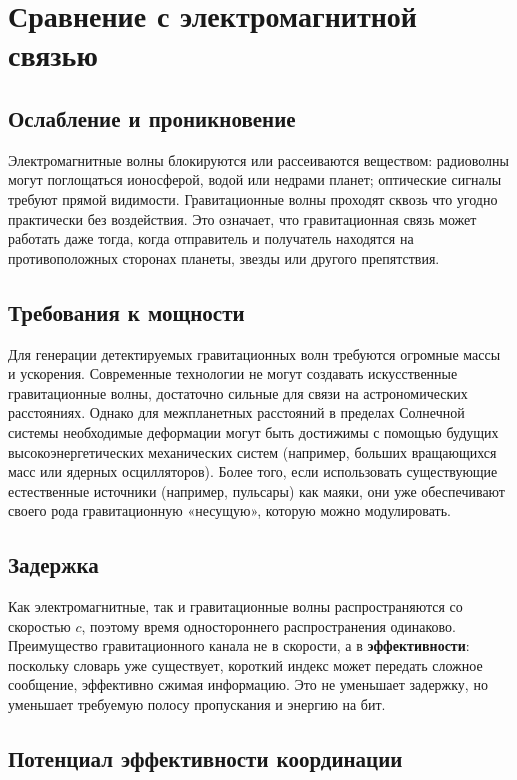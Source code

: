 \documentclass[12pt,a4paper]{article}
\begin{document}
	\section{Сравнение с электромагнитной связью}
	\label{sec:comparison}
	
	\subsection{Ослабление и проникновение}
	
	Электромагнитные волны блокируются или рассеиваются веществом: радиоволны могут поглощаться ионосферой, водой или недрами планет; оптические сигналы требуют прямой видимости. Гравитационные волны проходят сквозь что угодно практически без воздействия. Это означает, что гравитационная связь может работать даже тогда, когда отправитель и получатель находятся на противоположных сторонах планеты, звезды или другого препятствия.
	
	\subsection{Требования к мощности}
	
	Для генерации детектируемых гравитационных волн требуются огромные массы и ускорения. Современные технологии не могут создавать искусственные гравитационные волны, достаточно сильные для связи на астрономических расстояниях. Однако для межпланетных расстояний в пределах Солнечной системы необходимые деформации могут быть достижимы с помощью будущих высокоэнергетических механических систем (например, больших вращающихся масс или ядерных осцилляторов). Более того, если использовать существующие естественные источники (например, пульсары) как маяки, они уже обеспечивают своего рода гравитационную «несущую», которую можно модулировать.
	
	\subsection{Задержка}
	
	Как электромагнитные, так и гравитационные волны распространяются со скоростью \(c\), поэтому время одностороннего распространения одинаково. Преимущество гравитационного канала не в скорости, а в \textbf{эффективности}: поскольку словарь уже существует, короткий индекс может передать сложное сообщение, эффективно сжимая информацию. Это не уменьшает задержку, но уменьшает требуемую полосу пропускания и энергию на бит.
	
	\subsection{Потенциал эффективности координации}
	
\end{document}
